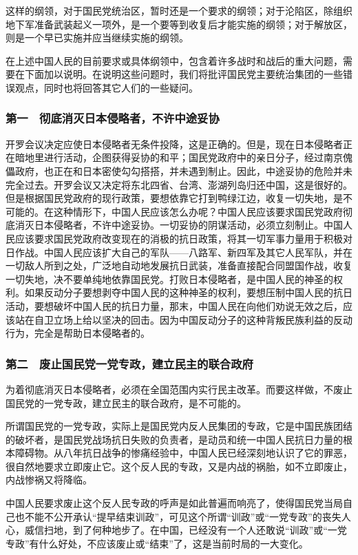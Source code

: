 这样的纲领，对于国民党统治区，暂时还是一个要求的纲领；对于沦陷区，除组织地下军准备武装起义一项外，是一个要等到收复后才能实施的纲领；对于解放区，则是一个早已实施并应当继续实施的纲领。

在上述中国人民的目前要求或具体纲领中，包含着许多战时和战后的重大问题，需要在下面加以说明。在说明这些问题时，我们将批评国民党主要统治集团的一些错误观点，同时也将回答其它人们的一些疑问。

\subsubsection{第一　彻底消灭日本侵略者，不许中途妥协}

开罗会议决定应使日本侵略者无条件投降，这是正确的。但是，现在日本侵略者正在暗地里进行活动，企图获得妥协的和平；国民党政府中的亲日分子，经过南京傀儡政府，也正在和日本密使勾勾搭搭，并未遇到制止。因此，中途妥协的危险并未完全过去。开罗会议又决定将东北四省、台湾、澎湖列岛归还中国，这是很好的。但是根据国民党政府的现行政策，要想依靠它打到鸭绿江边，收复一切失地，是不可能的。在这种情形下，中国人民应该怎么办呢？中国人民应该要求国民党政府彻底消灭日本侵略者，不许中途妥协。一切妥协的阴谋活动，必须立刻制止。中国人民应该要求国民党政府改变现在的消极的抗日政策，将其一切军事力量用于积极对日作战。中国人民应该扩大自己的军队——八路军、新四军及其它人民军队，并在一切敌人所到之处，广泛地自动地发展抗日武装，准备直接配合同盟国作战，收复一切失地，决不要单纯地依靠国民党。打败日本侵略者，是中国人民的神圣的权利。如果反动分子要想剥夺中国人民的这种神圣的权利，要想压制中国人民的抗日活动，要想破坏中国人民的抗日力量，那末，中国人民在向他们劝说无效之后，应该站在自卫立场上给以坚决的回击。因为中国反动分子的这种背叛民族利益的反动行为，完全是帮助日本侵略者的。

\subsubsection{第二　废止国民党一党专政，建立民主的联合政府}

为着彻底消灭日本侵略者，必须在全国范围内实行民主改革。而要这样做，不废止国民党的一党专政，建立民主的联合政府，是不可能的。

所谓国民党的一党专政，实际上是国民党内反人民集团的专政，它是中国民族团结的破坏者，是国民党战场抗日失败的负责者，是动员和统一中国人民抗日力量的根本障碍物。从八年抗日战争的惨痛经验中，中国人民已经深刻地认识了它的罪恶，很自然地要求立即废止它。这个反人民的专政，又是内战的祸胎，如不立即废止，内战惨祸又将降临。

中国人民要求废止这个反人民专政的呼声是如此普遍而响亮了，使得国民党当局自己也不能不公开承认“提早结束训政”，可见这个所谓“训政”或“一党专政”的丧失人心，威信扫地，到了何种地步了。在中国，已经没有一个人还敢说“训政”或“一党专政”有什么好处，不应该废止或“结束”了，这是当前时局的一大变化。

